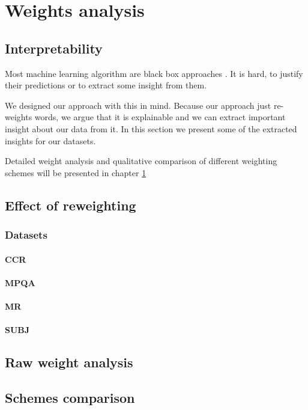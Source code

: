 \chapter{Weights analysis} \label{chap:weight:analysis}

    \section{Interpretability}
    Most machine learning algorithm are black box approaches \cite{ribeiro2016should}. %
    It is hard, to justify their predictions or to extract some insight from them. 
    
    We designed our approach with this in mind.
    Because our approach just re-weights words, we argue that it is explainable and we can extract important insight about our data from it.
    In this section we present some of the extracted insights for our datasets.
    
    Detailed weight analysis and qualitative comparison of different weighting schemes will be presented in chapter \ref{chap:weight:analysis}
    
    \* %

    \section{Effect of reweighting}
    
    
    \subsection{Datasets}
    
    
    \subsubsection{CCR}
    \subsubsection{MPQA}
    \subsubsection{MR}
    \subsubsection{SUBJ}
    

    \section{Raw weight analysis}
    
    
    \section{Schemes comparison}
